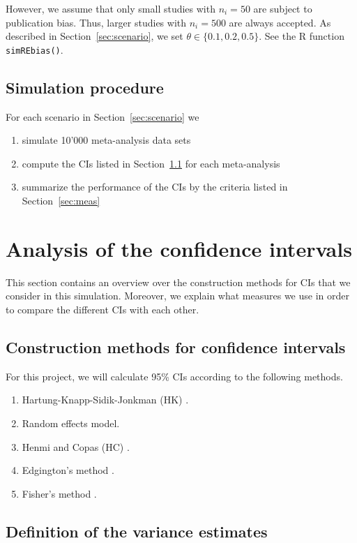 \documentclass[letterpaper, 12pt]{article}
\begin{document}
However, we assume that only small studies with $n_i = 50$ are subject to
publication bias. Thus, larger studies with $n_i = 500$ are always accepted.
As described in Section~\ref{sec:scenario}, we set $\theta \in \{0.1, 0.2, 0.5\}$.
See the R function \texttt{simREbias()}.

\subsection{Simulation procedure}
For each scenario in Section~\ref{sec:scenario} we
\begin{enumerate}
\item simulate 10'000 meta-analysis data sets
\item compute the CIs listed in Section~\ref{sec:method} for each meta-analysis
\item summarize the performance of the CIs by the criteria listed in
  Section~\ref{sec:meas}
\end{enumerate}

\section{Analysis of the confidence intervals} \label{sec:analysis}

This section contains an overview over the construction methods for CIs
that we consider in this simulation. Moreover, we explain what measures we
use in order to compare the different CIs with each other.

\subsection{Construction methods for confidence intervals} \label{sec:method}

For this project, we will calculate 95\% CIs according to the following methods.

\begin{enumerate}
  \item Hartung-Knapp-Sidik-Jonkman (HK) \citep{IntHoutIoannidis}.
  \item Random effects model.
  \item Henmi and Copas (HC) \citep{henm:copa:10}.
  \item Edgington's method \citep{edgington:72}.
  \item Fisher's method \citep{fisher:34}.
\end{enumerate}

\subsection{Definition of the variance estimates} \label{sec:varadj}
\end{document}
